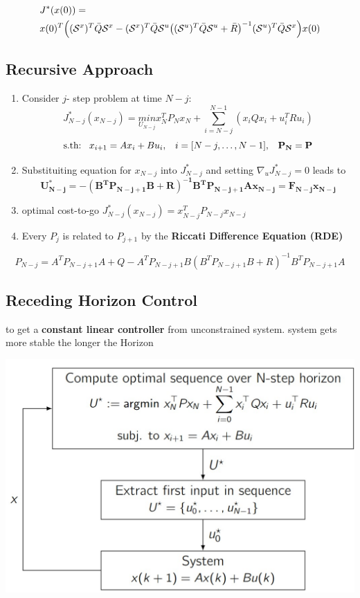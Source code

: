 \small\begin{align*}
    &J^*(x(0)) = \\ &x(0)^T \Big( (\mathcal{S}^x)^T\Bar{Q}\mathcal{S}^x-(\mathcal{S}^x)^T\Bar{Q}\mathcal{S}^u\big((\mathcal{S}^u)^T\Bar{Q}\mathcal{S}^u+\Bar{R}\big)^{-1}(\mathcal{S}^u)^T\Bar{Q}\mathcal{S}^x\Big)x(0)
    \end{align*}
    
\subsection{Recursive Approach}
    \begin{enumerate}
        \item Consider $j$- step problem at time $N-j$:
        \[
        J_{N-j}^*(x_{N-j}) = \underset{U_{N-j}}{min}x^T_NP_Nx_N + \sum^{N-1}_{i=N-j}(x_iQx_i+u_i^TRu_i)\]
        \[\textrm{s.th:\hspace{3mm}} x_{i+1} =Ax_i+Bu_i, \hspace{3mm}i = [N-j, \dots, N-1 ],\hspace{3mm} \mathbf{P_N = P} \]
        \item Substituiting equation for $x_{N-j}$ into $J^*_{N-j}$ and setting $\nabla_uJ^*_{N-j} = 0$ leads to
        {\tiny\[\mathbf{U^*_{N-j} = -(B^TP_{N-j+1}B+R)^{-1}B^TP_{N-j+1}Ax_{N-j}=F_{N-j}x_{N-j}}\]}
        \item optimal cost-to-go $J^*_{N-j}(x_{N-j})=x_{N-j}^TP_{N-j}x_{N-j}$
        \item Every $P_j$ is related to $P_{j+1}$ by the \textbf{Riccati Difference Equation (RDE)}
    \end{enumerate}
        {\tiny\[P_{N-j}=A^TP_{N-j+1}A + Q - A^TP_{N-j+1}B(B^TP_{N-j+1}B+R)^{-1} B^TP_{N-j+1} A\]}
\subsection{Receding Horizon Control}
to get a \textbf{constant linear controller} from unconstrained system. system gets more stable the longer the Horizon
\begin{center}
\includegraphics[width = 0.7\linewidth]{MPC_summary/Images/Screenshot 2021-07-31 170253.jpg}
\end{center}
